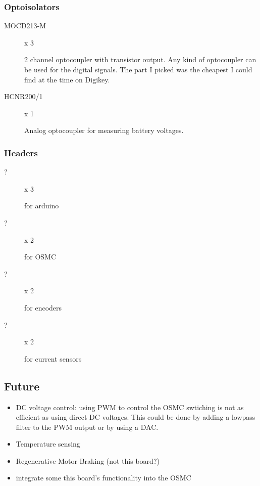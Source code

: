 \documentclass[letterpaper,12pt,notitlepage]{report}
\begin{document}
\subsubsection{Optoisolators}
\begin{description}
 \item[MOCD213-M] x 3

2 channel optocoupler with transistor output.  Any kind of optocoupler can be used for the digital signals.  The part I picked was the cheapest I could find at the time on Digikey.

 \item[HCNR200/1] x 1

Analog optocoupler for measuring battery voltages.
\end{description}

\subsubsection{Headers}
\begin{description}
 \item[?] x 3

for arduino

 \item[?] x 2

for OSMC

 \item[?] x 2

for encoders

 \item[?] x 2

for current sensors

 \end{description}

\subsection{Future}
\begin{itemize}
 \item DC voltage control: using PWM to control the OSMC swtiching is not as efficient as using direct DC voltages.  This could be done by adding a lowpass filter to the PWM output or by using a DAC.
 \item Temperature sensing
 \item Regenerative Motor Braking (not this board?)
 \item integrate some this board's functionality into the OSMC
\end{itemize}
\end{document}
